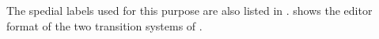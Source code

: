 The spedial labels used for this purpose are also listed in
.  shows the editor format of the two
transition systems of .



